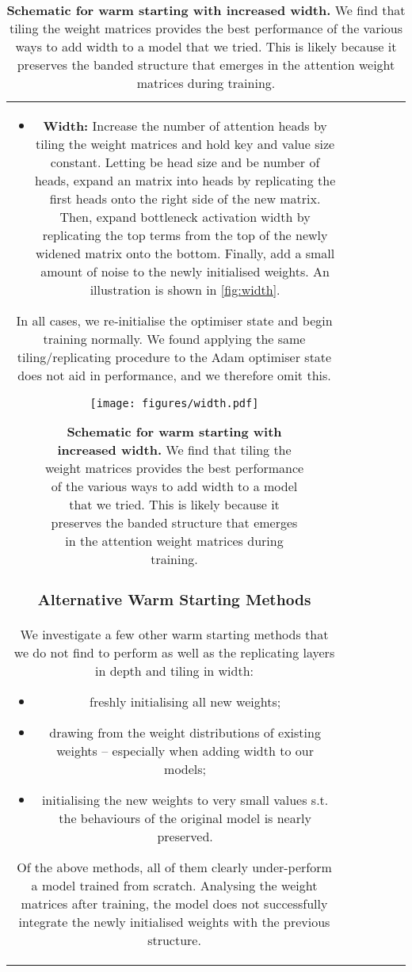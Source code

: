 \documentclass[11pt, a4paper, logo, internal, copyright, nonumbering]{deepmind}
\begin{document}
\begin{center}
\begin{longtable}{cclccc}
{\begin{itemize}
    \item \textbf{Width:} Increase the number of attention heads by tiling the weight matrices and hold key and value size constant.
    Letting  be head size and  be number of heads, expand an  matrix into  heads by replicating the first  heads onto the right side of the new matrix. Then, expand bottleneck activation width by replicating the top  terms from the top of the newly widened matrix onto the bottom.
    Finally, add a small amount of noise to the newly initialised weights. An illustration is shown in \autoref{fig:width}.
\end{itemize}
In all cases, we re-initialise the optimiser state and begin training normally.
We found applying the same tiling/replicating procedure to the Adam optimiser state does not aid in performance, and we therefore omit this.

\begin{figure}[t]
    \centering
    \texttt{[image: figures/width.pdf]}
    \caption{\textbf{Schematic for warm starting with increased width.}
    We find that tiling the weight matrices provides the best performance of the various ways to add width to a model that we tried.
    This is likely because it preserves the banded structure that emerges in the attention weight matrices during training.
    }
    \label{fig:width}
\end{figure}
\subsubsection{Alternative Warm Starting Methods}

We investigate a few other warm starting methods that we do not find to perform as well as the replicating layers in depth and tiling in width:
\begin{itemize}
    \item freshly initialising all new weights;
    \item drawing from the weight distributions of existing weights -- especially when adding width to our models;
    \item initialising the new weights to very small values s.t. the behaviours of the original model is nearly preserved.
\end{itemize}
Of the above methods, all of them clearly under-perform a model trained from scratch. 
Analysing the weight matrices after training, the model does not successfully integrate the newly initialised weights with the previous structure.

}
\end{longtable}
\end{center}
\end{document}
